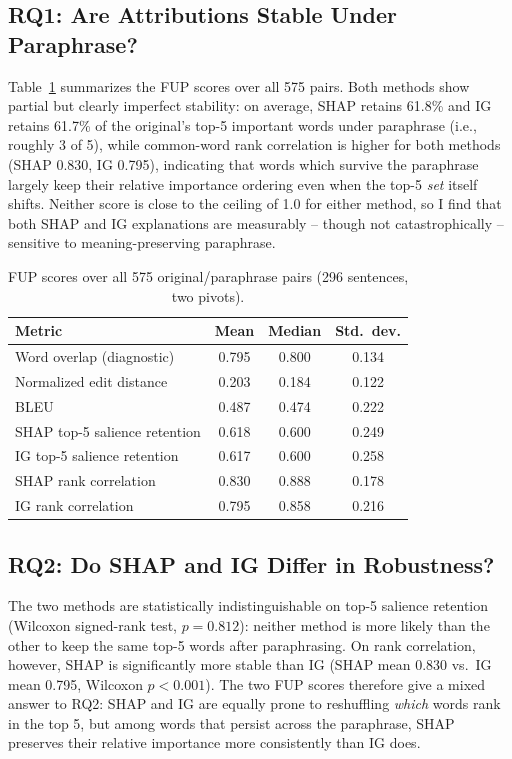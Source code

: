 \subsection{RQ1: Are Attributions Stable Under Paraphrase?}

Table~\ref{tab:fup-results} summarizes the FUP scores over all 575
pairs. Both methods show partial but clearly imperfect stability: on
average, SHAP retains 61.8\% and IG retains 61.7\% of the original's
top-5 important words under paraphrase (i.e., roughly 3 of 5), while
common-word rank correlation is higher for both methods (SHAP 0.830, IG
0.795), indicating that words which survive the paraphrase largely keep
their relative importance ordering even when the top-5 \emph{set}
itself shifts. Neither score is close to the ceiling of 1.0 for either
method, so I find that both SHAP and IG explanations are measurably --
though not catastrophically -- sensitive to meaning-preserving
paraphrase.

\begin{table}[t]
\centering
\caption{FUP scores over all 575 original/paraphrase pairs (296 sentences, two pivots).}
\label{tab:fup-results}
\begin{tabular}{lccc}
\toprule
Metric & Mean & Median & Std.\ dev. \\
\midrule
Word overlap (diagnostic)      & 0.795 & 0.800 & 0.134 \\
Normalized edit distance       & 0.203 & 0.184 & 0.122 \\
BLEU                           & 0.487 & 0.474 & 0.222 \\
SHAP top-5 salience retention  & 0.618 & 0.600 & 0.249 \\
IG top-5 salience retention    & 0.617 & 0.600 & 0.258 \\
SHAP rank correlation          & 0.830 & 0.888 & 0.178 \\
IG rank correlation            & 0.795 & 0.858 & 0.216 \\
\bottomrule
\end{tabular}
\end{table}

\subsection{RQ2: Do SHAP and IG Differ in Robustness?}

The two methods are statistically indistinguishable on top-5 salience
retention (Wilcoxon signed-rank test, $p = 0.812$): neither method is
more likely than the other to keep the same top-5 words after
paraphrasing. On rank correlation, however, SHAP is significantly more
stable than IG (SHAP mean 0.830 vs.\ IG mean 0.795, Wilcoxon
$p < 0.001$). The two FUP scores therefore give a mixed answer to RQ2:
SHAP and IG are equally prone to reshuffling \emph{which} words rank in
the top 5, but among words that persist across the paraphrase, SHAP
preserves their relative importance more consistently than IG does.

